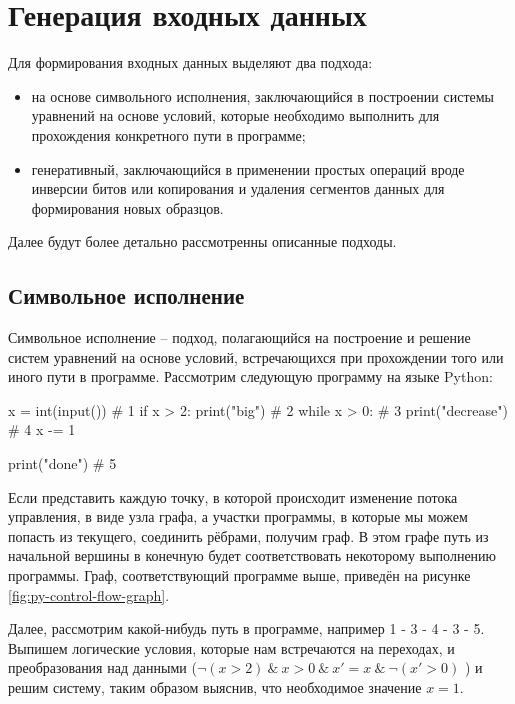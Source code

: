 \section{Генерация входных данных}

Для формирования входных данных выделяют два подхода:

\begin{itemize}
	
	\item на основе символьного исполнения, заключающийся в построении системы уравнений на основе условий, которые необходимо выполнить для прохождения конкретного пути в программе;
	
	\item генеративный, заключающийся в применении простых операций вроде инверсии битов или копирования и удаления сегментов данных для формирования новых образцов.
	
\end{itemize}

Далее будут более детально рассмотренны описанные подходы.

\subsection{Символьное исполнение}

Символьное исполнение -- подход, полагающийся на построение и решение систем уравнений на основе условий, встречающихся при прохождении того или иного пути в программе. Рассмотрим следующую программу на языке Python:
\begin{code}
x = int(input())      # 1
if x > 2:
    print("big")      # 2
while x > 0:          # 3
   print("decrease")  # 4
   x -= 1

print("done")         # 5
\end{code}

Если представить каждую точку, в которой происходит изменение потока управления, в виде узла графа, а участки программы, в которые мы можем попасть из текущего, соединить рёбрами, получим граф. В этом графе путь из начальной вершины в конечную будет соответствовать некоторому выполнению программы. Граф, соответствующий программе выше, приведён на рисунке \ref{fig:py-control-flow-graph}.

Далее, рассмотрим какой-нибудь путь в программе, например 1 - 3 - 4 - 3 - 5. Выпишем логические условия, которые нам встречаются на переходах, и преобразования над данными ($\neg (x > 2) \ \& \ x > 0 \ \& \ x'=x \ \& \ \neg (x'>0) $ ) и решим систему, таким образом выяснив, что необходимое значение $x = 1$.

